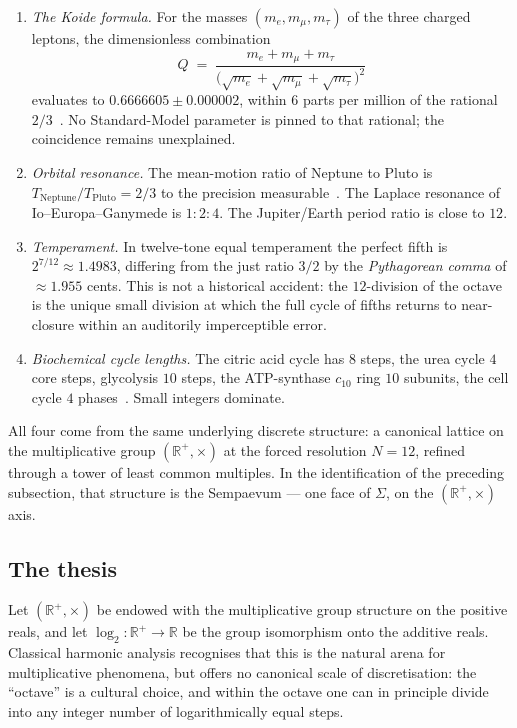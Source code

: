 \documentclass[11pt,a4paper]{article}
\theoremstyle{definition}
\theoremstyle{remark}
\newcommand{\R}{\mathbb{R}}
\begin{document}
\begin{enumerate}[leftmargin=*]
\item \emph{The Koide formula.} For the masses $(m_e,m_{\mu},m_{\tau})$ of the three charged leptons, the dimensionless combination
\[
Q \;=\; \frac{m_e+m_{\mu}+m_{\tau}}{\bigl(\sqrt{m_e}+\sqrt{m_{\mu}}+\sqrt{m_{\tau}}\bigr)^{2}}
\]
evaluates to $0.6666605\pm 0.000002$, within $6$ parts per million of the rational $2/3$~\cite{Koide1982}. No Standard-Model parameter is pinned to that rational; the coincidence remains unexplained.
\item \emph{Orbital resonance.} The mean-motion ratio of Neptune to Pluto is $T_{\mathrm{Neptune}}/T_{\mathrm{Pluto}}=2/3$ to the precision measurable~\cite{CohenHubbard1965}. The Laplace resonance of Io--Europa--Ganymede is $1{:}2{:}4$. The Jupiter/Earth period ratio is close to $12$.
\item \emph{Temperament.} In twelve-tone equal temperament the perfect fifth is $2^{7/12}\approx 1.4983$, differing from the just ratio $3/2$ by the \emph{Pythagorean comma} of $\approx 1.955$ cents. This is not a historical accident: the $12$-division of the octave is the unique small division at which the full cycle of fifths returns to near-closure within an auditorily imperceptible error.
\item \emph{Biochemical cycle lengths.} The citric acid cycle has $8$ steps, the urea cycle $4$ core steps, glycolysis $10$ steps, the ATP-synthase $c_{10}$ ring $10$ subunits, the cell cycle $4$ phases~\cite{Alberts}. Small integers dominate.
\end{enumerate}

All four come from the same underlying discrete structure: a canonical lattice on the multiplicative group $(\R^{+},\times)$ at the forced resolution $N=12$, refined through a tower of least common multiples. In the identification of the preceding subsection, that structure is the Sempaevum --- one face of $\Sigma$, on the $(\R^{+},\times)$ axis.

\subsection{The thesis}

Let $(\R^{+},\times)$ be endowed with the multiplicative group structure on the positive reals, and let $\log_{2}:\R^{+}\to\R$ be the group isomorphism onto the additive reals. Classical harmonic analysis recognises that this is the natural arena for multiplicative phenomena, but offers no canonical scale of discretisation: the ``octave'' is a cultural choice, and within the octave one can in principle divide into any integer number of logarithmically equal steps.
\end{document}
